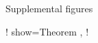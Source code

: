 
\ShowBackBib  %

\begin{Appendices}

\begin{Appendix}{Supplemental figures}
\end{Appendix}

\ShowListOfTheoremLike! {
    show=Theorem ,
}
\ShowListOfSourceCode!
\end{Appendices}

\ShowIndex
